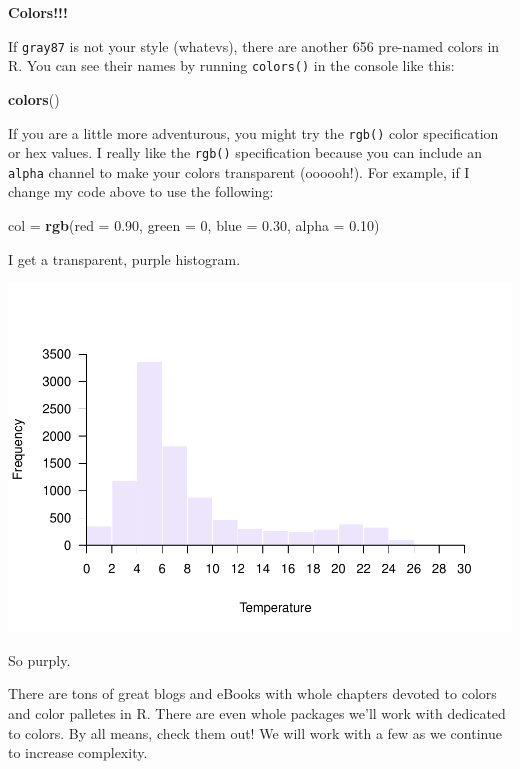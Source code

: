 \documentclass[
]{book}
\newenvironment{Shaded}{\begin{snugshade}}{\end{snugshade}}
\newcommand{\DataTypeTok}[1]{\textcolor[rgb]{0.13,0.29,0.53}{#1}}
\newcommand{\DecValTok}[1]{\textcolor[rgb]{0.00,0.00,0.81}{#1}}
\newcommand{\FloatTok}[1]{\textcolor[rgb]{0.00,0.00,0.81}{#1}}
\newcommand{\KeywordTok}[1]{\textcolor[rgb]{0.13,0.29,0.53}{\textbf{#1}}}
\newcommand{\NormalTok}[1]{#1}
\newcommand{\StringTok}[1]{\textcolor[rgb]{0.31,0.60,0.02}{#1}}
\begin{document}
\textbf{Colors!!!}

If \texttt{gray87} is not your style (whatevs), there are another 656 pre-named colors in R. You can see their names by running \texttt{colors()} in the console like this:

\begin{Shaded}
\begin{Highlighting}[]
\KeywordTok{colors}\NormalTok{()}
\end{Highlighting}
\end{Shaded}

If you are a little more adventurous, you might try the \texttt{rgb()} color specification or hex values. I really like the \texttt{rgb()} specification because you can include an \texttt{alpha} channel to make your colors transparent (oooooh!). For example, if I change my code above to use the following:

\begin{Shaded}
\begin{Highlighting}[]
\NormalTok{col =}\StringTok{ }\KeywordTok{rgb}\NormalTok{(}\DataTypeTok{red =} \FloatTok{0.90}\NormalTok{, }\DataTypeTok{green =} \DecValTok{0}\NormalTok{, }\DataTypeTok{blue =} \FloatTok{0.30}\NormalTok{, }\DataTypeTok{alpha =} \FloatTok{0.10}\NormalTok{)}
\end{Highlighting}
\end{Shaded}

I get a transparent, purple histogram.

\includegraphics{worstr_files/figure-latex/unnamed-chunk-91-1.pdf}

So purply.

There are tons of great blogs and eBooks with whole chapters devoted to colors and color palletes in R. There are even whole packages we'll work with dedicated to colors. By all means, check them out! We will work with a few as we continue to increase complexity.
\end{document}
